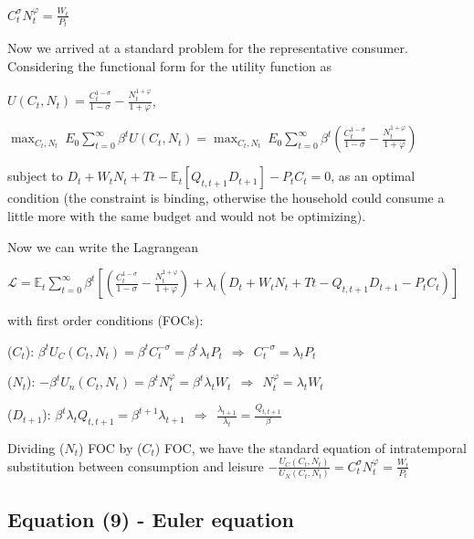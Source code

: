 \documentclass[
]{article}
\begin{document}
\(\displaystyle C_t^{\sigma}N_t^{\varphi} = \frac{W_t}{P_t}\)

\vspace{8pt}

Now we arrived at a standard problem for the representative consumer.
Considering the functional form for the utility function as

\(\displaystyle U(C_t,N_t)=\frac{C_t^{1-\sigma}}{1-\sigma}-\frac{N_t^{1+\varphi}}{1+\varphi}\),

\(\displaystyle \max_{C_t,N_t}\ E_0 \sum_{t=0}^\infty \beta^t U(C_t,N_t) = \displaystyle \max_{C_t,N_t} \ E_0 \sum_{t=0}^\infty \beta^t \left( \frac{C_t^{1-\sigma}}{1-\sigma}-\frac{N_t^{1+\varphi}}{1+\varphi} \right)\)

subject to
\(\displaystyle D_t + W_tN_t + Tt - \mathbb{E}_t[ Q_{t,t+1}D_{t+1}] - P_t C_t = 0\),
as an optimal condition (the constraint is binding, otherwise the
household could consume a little more with the same budget and would not
be optimizing).

Now we can write the Lagrangean

\(\mathcal{L} = \displaystyle \mathbb{E}_t \sum_{t=0}^\infty \beta^t \left[ \left( \frac{C_t^{1-\sigma}}{1-\sigma}-\frac{N_t^{1+\varphi}}{1+\varphi} \right) + \lambda_t \left( D_t + W_tN_t + Tt - Q_{t,t+1}D_{t+1} - P_t C_t \right) \right]\)

with first order conditions (FOCs):

(\(C_t\)):
\(\displaystyle \beta^t U_C(C_t,N_t)= \beta^tC_t^{-\sigma} = \beta^t \lambda_t P_t \ \ \Rightarrow \ \ C_t^{-\sigma} = \lambda_t P_t\)

(\(N_t\)):
\(\displaystyle -\beta^t U_n(C_t,N_t)=\beta^tN_t^{\varphi} = \beta^t \lambda_t W_t \ \ \Rightarrow \ \ N_t^{\varphi} = \lambda_t W_t\)

(\(D_{t+1}\)):
\(\displaystyle \beta^t \lambda_t Q_{t,t+1} = \beta^{t+1} \lambda_{t+1} \ \ \Rightarrow \ \ \frac{\lambda_{t+1}}{\lambda_t} = \frac{Q_{t,t+1}}{\beta}\)

Dividing (\(N_t\)) FOC by (\(C_t\)) FOC, we have the standard equation
of intratemporal substitution between consumption and leisure
\(\displaystyle -\frac{U_C(C_t,N_t)}{U_N(C_t,N_t)} =C_t^{\sigma}N_t^{\varphi} = \frac{W_t}{P_t}\)

\vspace{12pt}

\hypertarget{equation-9---euler-equation}{%
\subsection{Equation (9) - Euler
equation}\label{equation-9---euler-equation}}
\end{document}
